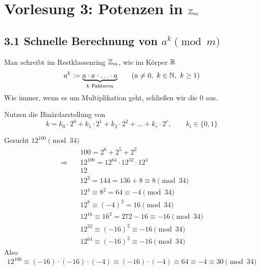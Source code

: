 
\section{Vorlesung 3: Potenzen in $\mathbb{Z}_{m}$}
\subsection{3.1 Schnelle Berechnung von $a^k \pmod{m}$}

Man schreibt im Restklassenring $\mathbb{Z}_{m}$, wie im Körper $\mathbb{R}$
\[
  a^k := \underbrace{a \cdot a \cdot \ldots \cdot a}_{k \text{ Faktoren}} \qquad (a \neq 0,\ k \in \mathbb{N},\ k \geq 1)
\]
Wie immer, wenn es um Multiplikation geht, schließen wir die 0 aus.

\begin{algorithmus}
Nutzen die Binärdarstellung von
\[
  k = k_0 \cdot 2^0 + k_1 \cdot 2^1 + k_2 \cdot 2^2 + \ldots + k_r \cdot 2^r , \qquad k_i \in \{0, 1\}
\]
\end{algorithmus}

\begin{beispiel}
Gesucht $12^{100} \pmod{34}$
\begin{align*}
  & 100 = 2^6 + 2^5 + 2^2 \\
  \Rightarrow\quad & 12^{100} = 12^{64} \cdot 12^{32} \cdot 12^{4} \\
  & 12 \\
  & 12^2 = 144 = 136 + 8 \equiv 8 \pmod{34} \\
  & 12^4 \equiv 8^2 = 64 \equiv -4 \pmod{34} \\
  & 12^8 \equiv (-4)^2 = 16 \pmod{34} \\
  & 12^{16} \equiv 16^2 = 272 - 16 \equiv -16 \pmod{34} \\
  & 12^{32} \equiv (-16)^2 \equiv -16 \pmod{34} \\
  & 12^{64} \equiv (-16)^2 \equiv -16 \pmod{34}
\end{align*}
Also
\[
  12^{100} \equiv (-16) \cdot (-16) \cdot (-4) \equiv (-16) \cdot (-4) \equiv 64 \equiv -4 \equiv 30 \pmod{34}
\]
\end{beispiel}

